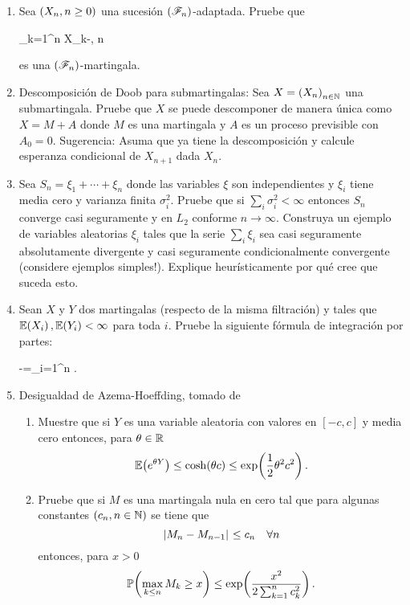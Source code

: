 
\begin{problema}
	\begin{enumerate}
		\item 
			Sea $\left( X_n,n\geq 0\right) $ una sucesi\'on $\left( \mathscr{F}_n\right) $-adaptada. Pruebe que
			
			\begin{esn}
				\sum_{k=1}^n X_k-, \quad n
			\end{esn}
			
			es una $\left( \mathscr{F}_n\right) $-martingala.
		
		\item
			Descomposici\'on de Doob para submartingalas: Sea \(X=\left( X_n\right) _{n\in\mathbb{N}}\) una submartingala. 
			Pruebe que $X$ se puede descomponer de manera \'unica como $X=M+A$ donde $M$ es una martingala y $A$ 
			es un proceso previsible con $A_0=0$. Sugerencia: Asuma que ya tiene la descomposici\'on y calcule 
			esperanza condicional de $X_{n+1}$ dada $X_n$. 
		
		\item 
			Sea \(S_n=\xi_1+\cdots+\xi_n\) donde las variables \(\xi\) son independientes y \(\xi_i\) tiene 
			media cero y varianza finita \(\sigma_i^2\). Pruebe que si \(\sum_i \sigma_i^2<\infty\) entonces 
			\(S_n\) converge casi seguramente y en \(L_2\) conforme \(n\to\infty\). Construya un ejemplo de 
			variables aleatorias \(\xi_i\) tales que la serie \(\sum_i \xi_i\) sea casi seguramente absolutamente 
			divergente y casi seguramente condicionalmente convergente (considere ejemplos simples!). 
			Explique heur\'isticamente por qu\'e cree que suceda esto.
		
		\item 
			Sean \(X\) y \(Y\) dos martingalas (respecto de la misma filtraci\'on) y tales que \(\mathbb{E}\! \left( X_i \right),\mathbb{E}\! \left( Y_i \right)<\infty\) 
			para toda \(i\). Pruebe la siguiente f\'ormula de integraci\'on por partes: 
			
			\begin{esn}
				-=\sum_{i=1}^n \esp{\paren{X_i-X_{i-1}}\paren{Y_i-Y_{i-1}}}. 
			\end{esn}
		
		\item Desigualdad de Azema-Hoeffding, tomado de \cite[E14.2, p.237]{MR1155402}
			\begin{enumerate}
				\item Muestre que si \(Y\) es una variable aleatoria con valores en \([-c,c]\) y media cero entonces, para \(\theta\in\mathbb{R}\)
						$$\mathbb{E}\! \left( e^{\theta Y} \right)\leq\cosh\!\left( \theta c\right) \leq \exp\!\left( \frac{1}{2}\theta^2c^2\right) . $$
				\item Pruebe que si \(M\) es una martingala nula en cero tal que para algunas constantes \(\left( c_n,n\in\mathbb{N}\right) \) se tiene que
						$$\hspace{.25mm}\left|M_n-M_{n-1}\right|\hspace{.25mm}\leq c_n\quad\forall n $$
						entonces, para \(x>0\)
						$$
						\mathbb{P}\! \left( \max_{k\leq n} M_k\geq x \right)\leq \exp\!\left( \frac{x^2}{2\sum_{k=1}^n c_k^2}\right) .
						$$
			\end{enumerate}
	\end{enumerate}
\end{problema}